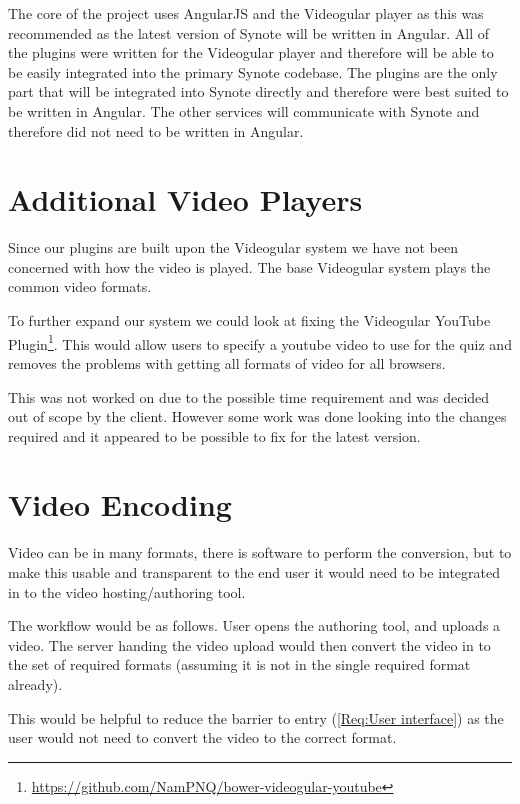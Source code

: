 The core of the project uses \gls{AngularJS} and the \gls{Videogular} player as this was recommended as the latest version of Synote will be written in Angular. All of the plugins were written for the \gls{Videogular} player and therefore will be able to be easily integrated into the primary Synote codebase. The plugins are the only part that will be integrated into Synote directly and therefore were best suited to be written in Angular. The other services will communicate with Synote and therefore did not need to be written in Angular.

\section{Additional Video Players}

Since our plugins are built upon the \gls{Videogular} system we have not been concerned with how the video is played. The base \gls{Videogular} system plays the common video formats.

To further expand our system we could look at fixing the \gls{Videogular} YouTube Plugin\footnote{\url{https://github.com/NamPNQ/bower-videogular-youtube}}. This would allow users to specify a youtube video to use for the quiz and removes the problems with getting all formats of video for all browsers.

This was not worked on due to the possible time requirement and was decided out of scope by the client. However some work was done looking into the changes required and it appeared to be possible to fix for the latest version.

\section{Video Encoding}

Video can be in many formats, there is software to perform the conversion, but to make this usable and transparent to the end user it would need to be integrated in to the video hosting/authoring tool.

The workflow would be as follows. User opens the authoring tool, and uploads a video. The server handing the video upload would then convert the video in to the set of required formats (assuming it is not in the single required format already).

This would be helpful to reduce the barrier to entry (\cref{Req:User interface}) as the user would not need to convert the video to the correct format.


